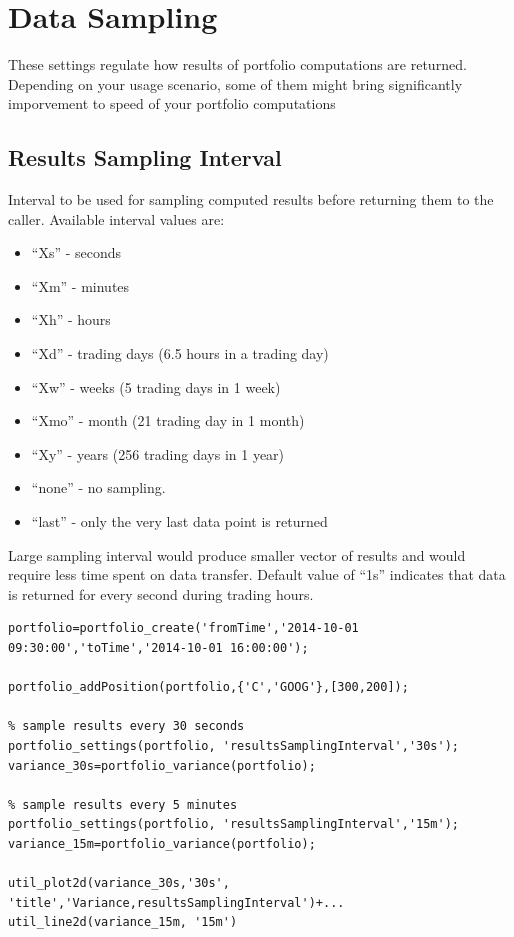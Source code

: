 \documentclass[letterpaper]{report}
\begin{document}
\section{Data Sampling}
These settings regulate how results of portfolio computations are returned. 
Depending on your usage scenario, some of them might bring significantly imporvement to speed of your portfolio computations
\subsection{Results Sampling Interval}
Interval to be used for sampling computed results before returning them to the caller. 
Available interval values are: 
\begin{itemize} 
  \item ``Xs'' - seconds
  \item ``Xm'' - minutes
  \item ``Xh'' - hours
  \item ``Xd'' - trading days (6.5 hours in a trading day)
  \item ``Xw'' - weeks (5 trading days in 1 week)
  \item ``Xmo'' - month (21 trading day in 1 month)
  \item ``Xy'' - years (256 trading days in 1 year)
  \item ``none'' - no sampling.
  \item ``last'' - only the very last data point is returned  
\end{itemize}
Large sampling interval would produce smaller vector of results and would require less time spent on data transfer. 
Default value of ``1s'' indicates that data is returned for every second during
trading hours.
\begin{lstlisting}
portfolio=portfolio_create('fromTime','2014-10-01 09:30:00','toTime','2014-10-01 16:00:00');

portfolio_addPosition(portfolio,{'C','GOOG'},[300,200]);

% sample results every 30 seconds
portfolio_settings(portfolio, 'resultsSamplingInterval','30s');
variance_30s=portfolio_variance(portfolio);

% sample results every 5 minutes
portfolio_settings(portfolio, 'resultsSamplingInterval','15m');
variance_15m=portfolio_variance(portfolio);

util_plot2d(variance_30s,'30s', 'title','Variance,resultsSamplingInterval')+...
util_line2d(variance_15m, '15m')
\end{lstlisting}
\end{document}
